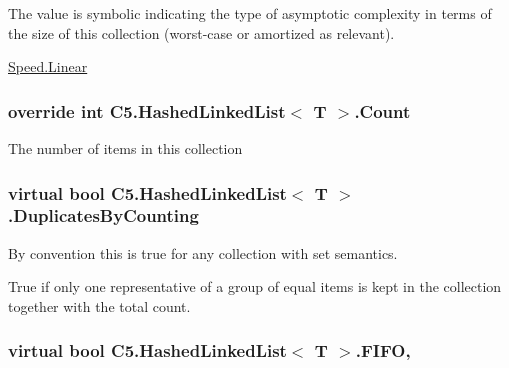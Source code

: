 The value is symbolic indicating the type of asymptotic complexity in terms of the size of this collection (worst-\/case or amortized as relevant). 

\hyperlink{namespace_c5_a615ba88dcdaa8d5a3c5f833a73d7fad6a32a843da6ea40ab3b17a3421ccdf671b}{Speed.\+Linear}\hypertarget{class_c5_1_1_hashed_linked_list_a73efb105a40772ad5ca242801db6d5ff}{}
\subsubsection[{Count}]{\setlength{\rightskip}{0pt plus 5cm}override int {\bf C5.\+Hashed\+Linked\+List}$<$ T $>$.Count\hspace{0.3cm}{\ttfamily [get]}}\label{class_c5_1_1_hashed_linked_list_a73efb105a40772ad5ca242801db6d5ff}




The number of items in this collection\hypertarget{class_c5_1_1_hashed_linked_list_a3106d441e4ac4a901b7f464402957382}{}
\subsubsection[{Duplicates\+By\+Counting}]{\setlength{\rightskip}{0pt plus 5cm}virtual bool {\bf C5.\+Hashed\+Linked\+List}$<$ T $>$.Duplicates\+By\+Counting\hspace{0.3cm}{\ttfamily [get]}}\label{class_c5_1_1_hashed_linked_list_a3106d441e4ac4a901b7f464402957382}


By convention this is true for any collection with set semantics. 

True if only one representative of a group of equal items is kept in the collection together with the total count.\hypertarget{class_c5_1_1_hashed_linked_list_a177c8639ed7154131ac278bac877fd0c}{}
\subsubsection[{F\+I\+F\+O}]{\setlength{\rightskip}{0pt plus 5cm}virtual bool {\bf C5.\+Hashed\+Linked\+List}$<$ T $>$.F\+I\+F\+O\hspace{0.3cm}{\ttfamily [get]}, {\ttfamily [set]}}\label{class_c5_1_1_hashed_linked_list_a177c8639ed7154131ac278bac877fd0c}


